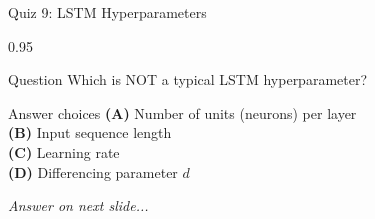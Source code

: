 \documentclass[9pt, aspectratio=169, t]{beamer}
\begin{document}
\begin{frame}{Quiz 9: LSTM Hyperparameters}
    \begin{cminipage}{0.95\textwidth}
    \begin{alertblock}{Question}
        Which is NOT a typical LSTM hyperparameter?
    \end{alertblock}

    \vspace{0.4cm}

    \begin{block}{Answer choices}
        \textcolor{MainBlue}{\textbf{(A)}} Number of units (neurons) per layer\\[3pt]
        \textcolor{MainBlue}{\textbf{(B)}} Input sequence length\\[3pt]
        \textcolor{MainBlue}{\textbf{(C)}} Learning rate\\[3pt]
        \textcolor{MainBlue}{\textbf{(D)}} Differencing parameter $d$
    \end{block}

    \vspace{0.5cm}

    \begin{center}
        \textit{Answer on next slide...}
    \end{center}
    \end{cminipage}
\end{frame}
\end{document}
